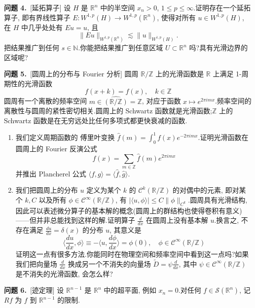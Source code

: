 \noindent\textbf{问题 4.}~[延拓算子] 设 $H$ 是 $\mathbb{R}^n$ 中的半空间 $x_n > 0$, $1 \leq p \leq \infty$.证明存在一个延拓算子, 即有界线性算子 $E: W^{1, p}(H) \to W^{1, p}(\mathbb{R}^n)$, 使得对所有 $u \in W^{1, p}(H)$, 在 $H$ 中几乎处处有 $Eu = u$, 且
\[
\|Eu\|_{W^{1, p}(\mathbb{R}^n)} \lesssim \|u\|_{W^{1, p}(H)}.
\]
把结果推广到任何 $s \in \mathbb{N}$.你能把结果推广到任意区域 $U \subset \mathbb{R}^n$ 吗?具有光滑边界的区域呢?

\noindent\textbf{问题 5.}~[圆周上的分布与 Fourier 分析] 圆周 $\mathbb{R}/\mathbb{Z}$ 上的光滑函数是 $\mathbb{R}$ 上满足 1-周期性的光滑函数
\[
f(x + k) = f(x), \quad k \in \mathbb{Z}
\]
圆周有一个离散的频率空间 $m \in \widehat{(\mathbb{R}/\mathbb{Z})} = \mathbb{Z}$, 对应于函数 $x \mapsto e^{2\pi i m x}$.频率空间的离散性与圆周的紧性密切相关.圆周上的 Schwartz 函数就是光滑函数;$\mathbb{Z}$ 上的 Schwartz 函数是在无穷远处比任何多项式都更快衰减的函数.

\begin{enumerate}
\renewcommand{\labelenumi}{\alph{enumi}.}
\item 我们定义周期函数的 傅里叶变换 $\hat{f}(m) = \int_0^1 f(x) e^{-2\pi i m x}$.证明光滑函数在圆周上的 Fourier 反演公式
\[
f(x) = \sum_{m \in \mathbb{Z}} \hat{f}(m) e^{2\pi i m x}
\]
并推出 Plancherel 公式 $\langle f, g \rangle = \langle \hat{f}, \hat{g} \rangle$.
\item 我们把圆周上的分布 $u$ 定义为某个 $k$ 的 $\mathcal{C}^k(\mathbb{R}/\mathbb{Z})$ 的对偶中的元素, 即对某个 $k, C$ 以及所有 $\phi \in \mathcal{C}^\infty(\mathbb{R}/\mathbb{Z})$, 有 $|\langle u, \phi \rangle| \leq C \|\phi\|_{C^k}$.圆周具有光滑结构, 因此可以表述微分算子的基本解的概念(圆周上的群结构也使得卷积有意义)——但并非总能找到这样的解.证明算子 $\frac{d}{dx}$ 在圆周上没有基本解 $u$.换言之, 不存在满足 $\frac{du}{dx} = \delta(x)$ 的分布 $u$, 其意义是
\[
\langle \frac{du}{dx}, \phi \rangle \equiv -\langle u, \frac{d\phi}{dx} \rangle = \phi(0), \quad \phi \in \mathcal{C}^\infty(\mathbb{R}/\mathbb{Z})
\]
证明这一点有很多方法.你能同时在物理空间和频率空间中看到这一点吗?如果我们把向量场 $\frac{d}{dx}$ 换成另一个不消失的向量场 $\tilde{D} = \psi \frac{d}{dx}$, 其中 $\psi \in \mathcal{C}^\infty(\mathbb{R}/\mathbb{Z})$ 是不消失的光滑函数, 会怎么样?
\end{enumerate}

\noindent\textbf{问题 6.}~[迹定理] 设 $\mathbb{R}^{n-1}$ 是 $\mathbb{R}^n$ 中的超平面, 例如 $x_n = 0$.对任何 $f \in \mathcal{S}(\mathbb{R}^n)$, 记 $Rf$ 为 $f$ 到 $\mathbb{R}^{n-1}$ 的限制.

